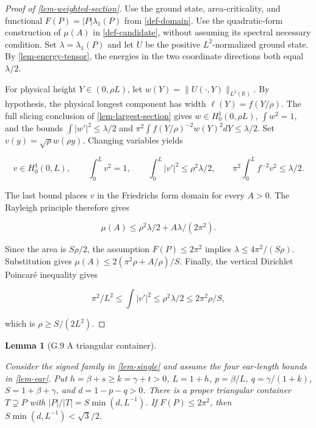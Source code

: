 \documentclass[11pt,a4paper]{article}
\theoremstyle{proofmanuscript}
\newtheorem{lemma}[theorem]{Lemma}
\begin{document}
\begin{proof}[Proof of \ref{lem-weighted-section}]

Use the ground state, area-criticality, and functional \(F(P)=|P|\lambda_1(P)\) from \ref{def-domain}. Use the quadratic-form construction of \(\mu(A)\) in \ref{def-candidate}, without assuming its spectral necessary condition. Set \(\lambda=\lambda_1(P)\) and let \(U\) be the positive \(L^2\)-normalized ground state. By \ref{lem-energy-tensor}, the energies in the two coordinate directions both equal \(\lambda/2\).

For physical height \(Y\in(0,\rho L)\), let \(w(Y)=\|U(\cdot,Y)\|_{L^2(\mathbb R)}\). By hypothesis, the physical longest component has width \(\ell(Y)=f(Y/\rho)\). The full slicing conclusion of \ref{lem-largest-section} gives \(w\in H_0^1(0,\rho L)\), \(\int w^2=1\), and the bounds \(\int|w'|^2\le\lambda/2\) and \(\pi^2\int f(Y/\rho)^{-2}w(Y)^2dY\le\lambda/2\). Set \(v(y)=\sqrt\rho w(\rho y)\). Changing variables yields

\[
 v\in H_0^1(0,L),\qquad\int_0^L v^2=1,\qquad
\int_0^L|v'|^2\le\rho^2\lambda/2,\qquad
\pi^2\int_0^L f^{-2}v^2\le\lambda/2.
\]

The last bound places \(v\) in the Friedrichs form domain for every \(A>0\). The Rayleigh principle therefore gives

\[
\mu(A)\le\rho^2\lambda/2+A\lambda/(2\pi^2).
\]

Since the area is \(S\rho/2\), the assumption \(F(P)\le2\pi^2\) implies \(\lambda\le4\pi^2/(S\rho)\). Substitution gives \(\mu(A)\le2(\pi^2\rho+A/\rho)/S\). Finally, the vertical Dirichlet Poincaré inequality gives

\[
\pi^2/L^2\le\int|v'|^2\le\rho^2\lambda/2\le2\pi^2\rho/S,
\]

which is \(\rho\ge S/(2L^2)\).

\end{proof}

\begin{lemma}[G.9 A triangular container]\label{lem-triangle-container}

Consider the signed family in \ref{lem-single} and assume the four ear-length bounds in \ref{lem-ear}. Put \(h=\beta+s\ge k=\gamma+t>0\), \(L=1+h\), \(p=\beta/L\), \(q=\gamma/(1+k)\), \(S=1+\beta+\gamma\), and \(d=1-p-q>0\). There is a proper triangular container \(T\supsetneq P\) with \(|P|/|T|=S\min(d,L^{-1})\). If \(F(P)\le2\pi^2\), then \(S\min(d,L^{-1})<\sqrt3/2\).

\end{lemma}
\end{document}
